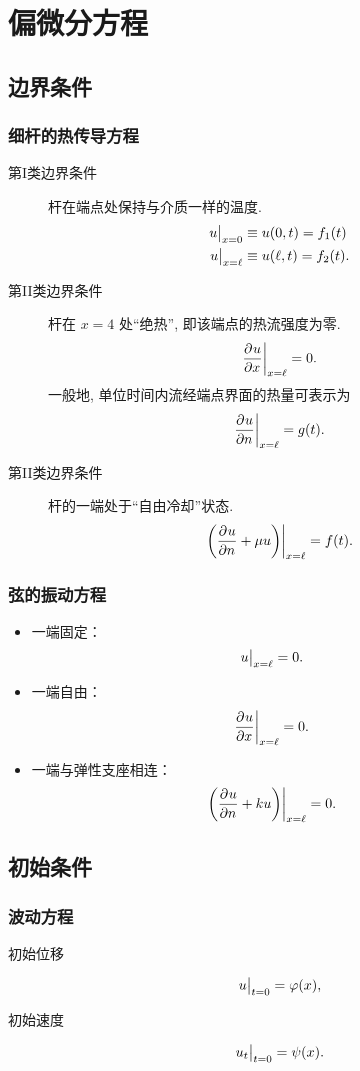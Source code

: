 \section{偏微分方程}

\subsection{边界条件}

\subsubsection{细杆的热传导方程}
\begin{description}
	\item[第I类边界条件]杆在端点处保持与介质一样的温度.
	\begin{align*}
		\eval[1]{u}_{x = 0} & \equiv u(0,t) = f_1(t) \\
		\eval[1]{u}_{x = \ell} & \equiv u(\ell,t) = f_2(t).
	\end{align*}
	
	\item[第II类边界条件]杆在 $x = 4$ 处“绝热”, 即该端点的热流强度为零.
	\[
		\eval[3]{\dpd ux}_{x = \ell} = 0.
	\]
	一般地, 单位时间内流经端点界面的热量可表示为
	\[
		\eval[3]{\dpd un}_{x = \ell} = g(t).
	\]
	
	\item[第II类边界条件]杆的一端处于“自由冷却”状态.
	\[
		\eval[3]{\del[3]{\dpd un + \mu u}}_{x = \ell} = f(t).
	\]
\end{description}

\subsubsection{弦的振动方程}
\begin{itemize}
	\item 一端固定：
	\[
		\eval[1]{u}_{x = \ell} = 0.
	\]
	
	\item 一端自由：
	\[
		\eval[3]{\dpd ux}_{x = \ell} = 0.
	\]
	
	\item 一端与弹性支座相连：
	\[
		\eval[3]{\del[3]{\dpd un + ku}}_{x = \ell} = 0.
	\]
\end{itemize}

\subsection{初始条件}

\subsubsection{波动方程}
\begin{description}
	\item[初始位移]
	\[
		\eval[1]{u}_{t = 0} = \varphi(x),
	\]
	
	\item[初始速度]
	\[
		\eval[1]{u_t}_{t = 0} = \psi(x).
	\]
\end{description}


